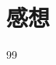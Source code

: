 \documentclass[autodetect-engine,dvi=dvipdfmx,ja=standard,
               a4j,11pt]{bxjsarticle}
\begin{document}




\section{感想}


\begin{thebibliography}{99}
\end{thebibliography}

\end{document}
